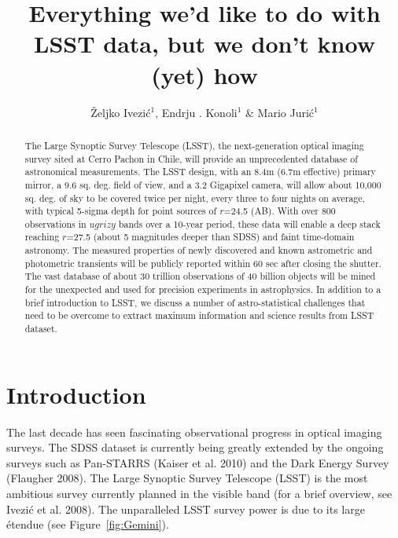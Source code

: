 \documentclass{iau}
\title[Everything we’d like to do with LSST data, but we don’t know (yet) how] %
{Everything we'd like to do with LSST data, but we don't know (yet) how}
\author[Ivezi\'{c}, Konoli, \& Juri\'{c}]   %
{\v{Z}eljko Ivezi\'{c}$^1$, Endrju \DJ{}. Konoli$^1$ \& Mario Juri\'{c}$^1$
}
\affiliation{
$^1$ Department of Astronomy, University of Washington, \\ Box 351580, Seattle, WA 98195-1580, USA\\ 
                               email: {\tt ivezic@astro.washington.edu}
}
\begin{document}
 
\maketitle

\begin{abstract}
The Large Synoptic Survey Telescope (LSST), the next-generation optical imaging survey 
sited at Cerro Pachon in Chile, will provide an unprecedented database of astronomical
measurements. The LSST design, with an 8.4m (6.7m effective) primary mirror, a 9.6 sq. deg.
field of view, and a 3.2 Gigapixel camera, will allow about 10,000 sq. deg. of sky to be 
covered twice per night, every three to four nights on average, with typical 5-sigma depth 
for point sources of  $r$=24.5 (AB). With over 800 observations in $ugrizy$ bands over a 
10-year period, these data will enable a deep stack reaching $r$=27.5 (about 5 magnitudes 
deeper than SDSS) and faint time-domain astronomy. The measured properties of newly 
discovered and known astrometric and photometric transients will be publicly reported 
within 60 sec after closing the shutter. The vast database of about 30 trillion observations 
of 40 billion objects will be mined for the unexpected and used for precision experiments 
in astrophysics. In addition to a brief introduction to LSST, we discuss a number of 
astro-statistical challenges that need to be overcome to extract maximum information 
and science results from LSST dataset.  
\end{abstract}

\firstsection %


\section{Introduction \label{sec:lsst}}

The last decade has seen fascinating observational progress in optical imaging surveys.
The SDSS dataset is currently being greatly extended by the ongoing surveys such as 
Pan-STARRS (Kaiser et al. 2010) and the Dark Energy Survey (Flaugher 2008). The Large Synoptic 
Survey Telescope (LSST)  is the most ambitious survey currently planned in the visible band
(for a brief overview, see Ivezi\'{c} et al. 2008). The unparalleled LSST survey power is due to 
its large \'etendue (see Figure~\ref{fig:Gemini}). 
\end{document}
